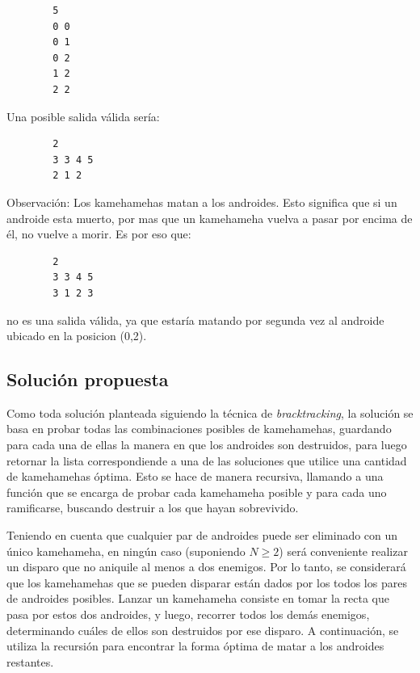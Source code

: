         \begin{verbatim}
        5
        0 0
        0 1
        0 2
        1 2
        2 2
        \end{verbatim}

        Una posible salida válida sería:

        \begin{verbatim}
        2
        3 3 4 5
        2 1 2
        \end{verbatim}

        Observación: Los kamehamehas matan a los androides. Esto significa que si un androide esta muerto, por mas que un kamehameha vuelva a pasar por encima de él, no vuelve a morir. Es por eso que:

        \begin{verbatim}
        2
        3 3 4 5
        3 1 2 3
        \end{verbatim}

        no es una salida válida, ya que estaría matando por segunda vez al androide ubicado en la posicion (0,2).
        
    \subsection{Solución propuesta}

    Como toda solución planteada siguiendo la técnica de \emph{bracktracking}, la solución se basa en probar todas las combinaciones posibles de kamehamehas, guardando para cada una de ellas la manera en que los androides son destruidos, para luego retornar la lista correspondiende a una de las soluciones que utilice una cantidad de kamehamehas óptima. Esto se hace de manera recursiva, llamando a una función que se encarga de probar cada kamehameha posible y para cada uno ramificarse, buscando destruir a los que hayan sobrevivido.

    Teniendo en cuenta que cualquier par de androides puede ser eliminado con un único kamehameha, en ningún caso (suponiendo $N \geq 2$) será conveniente realizar un disparo que no aniquile al menos a dos enemigos. Por lo tanto, se considerará que los kamehamehas que se pueden disparar están dados por los todos los pares de androides posibles. Lanzar un kamehameha consiste en tomar la recta que pasa por estos dos androides, y luego, recorrer todos los demás enemigos, determinando cuáles de ellos son destruidos por ese disparo. A continuación, se utiliza la recursión para encontrar la forma óptima de matar a los androides restantes.

